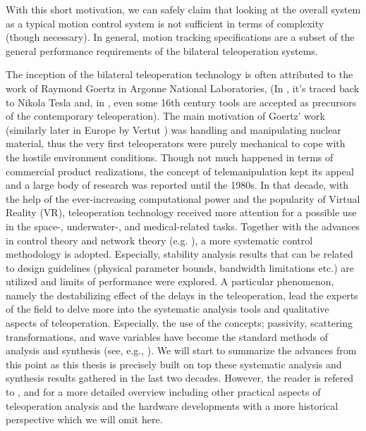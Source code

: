 With this short motivation, we can safely claim that looking at the overall system as a typical motion control 
system is not sufficient in terms of complexity (though necessary). In general, motion tracking specifications 
are a subset of the general performance requirements of the bilateral teleoperation systems. 



The inception of the bilateral teleoperation technology is often attributed to the work 
of Raymond Goertz in Argonne National Laboratories, \cite{goertz} (In \cite{basanezsuarez}, 
it's traced back to Nikola Tesla and, in \cite{sheridan89}, even some 16th century tools are accepted as precursors 
of the contemporary  teleoperation). The main motivation of Goertz' work (similarly later in Europe 
by Vertut \cite{vertutcoiffet}) was handling and manipulating nuclear material, thus the very 
first teleoperators were purely mechanical to cope with the hostile environment conditions. Though not much 
happened in terms of commercial product realizations, the concept of telemanipulation kept its appeal 
and a large body of research was reported until the 1980s. In that decade, with the help of the 
ever-increasing computational power and the popularity of Virtual Reality (VR), teleoperation 
technology received more attention for a possible use in the space-, underwater-, and medical-related 
tasks. Together with the advances in control theory and network theory (e.g. \cite{miyazaki,furuta}), 
a more systematic control methodology is adopted. Especially, stability analysis results that can be 
related to design guidelines (physical parameter bounds, bandwidth limitations etc.) are utilized
and limits of performance were explored. A particular phenomenon, namely the destabilizing effect 
of the delays in the teleoperation, lead the experts of the field to delve more into the systematic 
analysis tools and qualitative aspects of teleoperation. Especially, the use of the concepts; passivity, 
scattering transformations, and wave variables have become the standard methods of analysis and synthesis
(see, e.g., \cite{hannaford89,andersonspong,nieslotine}). We will start to summarize the advances from this 
point as this thesis is precisely built on top these systematic analysis and synthesis results gathered in 
the last two decades. However, the reader is refered to \cite{hokayemspong,burdea}, 
and \cite{sheridan89} for a more detailed overview including other practical aspects of teleoperation analysis and 
the hardware developments with a more historical perspective which we will omit here. 


